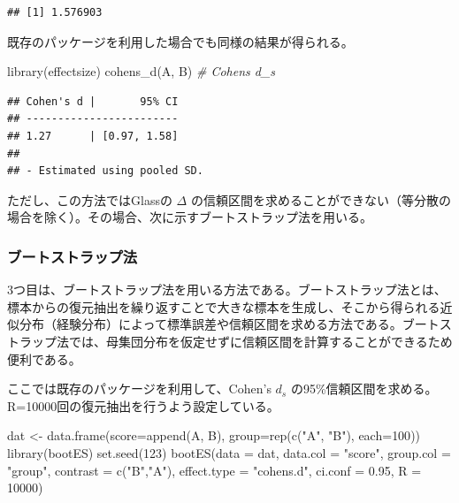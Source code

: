 \documentclass[
  ja=standard, xelatex, base=12pt]{bxjsreport}
\newenvironment{Shaded}{\begin{snugshade}}{\end{snugshade}}
\newcommand{\AttributeTok}[1]{\textcolor[rgb]{0.77,0.63,0.00}{#1}}
\newcommand{\CommentTok}[1]{\textcolor[rgb]{0.56,0.35,0.01}{\textit{#1}}}
\newcommand{\DecValTok}[1]{\textcolor[rgb]{0.00,0.00,0.81}{#1}}
\newcommand{\FloatTok}[1]{\textcolor[rgb]{0.00,0.00,0.81}{#1}}
\newcommand{\FunctionTok}[1]{\textcolor[rgb]{0.00,0.00,0.00}{#1}}
\newcommand{\NormalTok}[1]{#1}
\newcommand{\OtherTok}[1]{\textcolor[rgb]{0.56,0.35,0.01}{#1}}
\newcommand{\StringTok}[1]{\textcolor[rgb]{0.31,0.60,0.02}{#1}}
\begin{document}
\begin{verbatim}
## [1] 1.576903
\end{verbatim}

既存のパッケージを利用した場合でも同様の結果が得られる。

\begin{Shaded}
\begin{Highlighting}[]
\FunctionTok{library}\NormalTok{(effectsize)}
\FunctionTok{cohens\_d}\NormalTok{(A, B)  }\CommentTok{\# Cohen\textquotesingle{}s d\_s}
\end{Highlighting}
\end{Shaded}

\begin{verbatim}
## Cohen's d |       95% CI
## ------------------------
## 1.27      | [0.97, 1.58]
## 
## - Estimated using pooled SD.
\end{verbatim}

ただし、この方法ではGlassの \(\Delta\) の信頼区間を求めることができない（等分散の場合を除く）。その場合、次に示すブートストラップ法を用いる。

\hypertarget{ux30d6ux30fcux30c8ux30b9ux30c8ux30e9ux30c3ux30d7ux6cd5}{%
\subsubsection{ブートストラップ法}\label{ux30d6ux30fcux30c8ux30b9ux30c8ux30e9ux30c3ux30d7ux6cd5}}

3つ目は、ブートストラップ法を用いる方法である。ブートストラップ法とは、標本からの復元抽出を繰り返すことで大きな標本を生成し、そこから得られる近似分布（経験分布）によって標準誤差や信頼区間を求める方法である。ブートストラップ法では、母集団分布を仮定せずに信頼区間を計算することができるため便利である。

ここでは既存のパッケージを利用して、Cohen's \(d_s\) の95\%信頼区間を求める。R=10000回の復元抽出を行うよう設定している。

\begin{Shaded}
\begin{Highlighting}[]
\NormalTok{dat }\OtherTok{\textless{}{-}} \FunctionTok{data.frame}\NormalTok{(}\AttributeTok{score=}\FunctionTok{append}\NormalTok{(A, B), }\AttributeTok{group=}\FunctionTok{rep}\NormalTok{(}\FunctionTok{c}\NormalTok{(}\StringTok{"A"}\NormalTok{, }\StringTok{"B"}\NormalTok{), }\AttributeTok{each=}\DecValTok{100}\NormalTok{))}
\FunctionTok{library}\NormalTok{(bootES)}
\FunctionTok{set.seed}\NormalTok{(}\DecValTok{123}\NormalTok{)}
\FunctionTok{bootES}\NormalTok{(}\AttributeTok{data =}\NormalTok{ dat, }\AttributeTok{data.col =} \StringTok{"score"}\NormalTok{, }\AttributeTok{group.col =} \StringTok{"group"}\NormalTok{, }\AttributeTok{contrast =} \FunctionTok{c}\NormalTok{(}\StringTok{"B"}\NormalTok{,}\StringTok{"A"}\NormalTok{), }
       \AttributeTok{effect.type =} \StringTok{"cohens.d"}\NormalTok{, }\AttributeTok{ci.conf =} \FloatTok{0.95}\NormalTok{, }\AttributeTok{R =} \DecValTok{10000}\NormalTok{)}
\end{Highlighting}
\end{Shaded}
\end{document}

